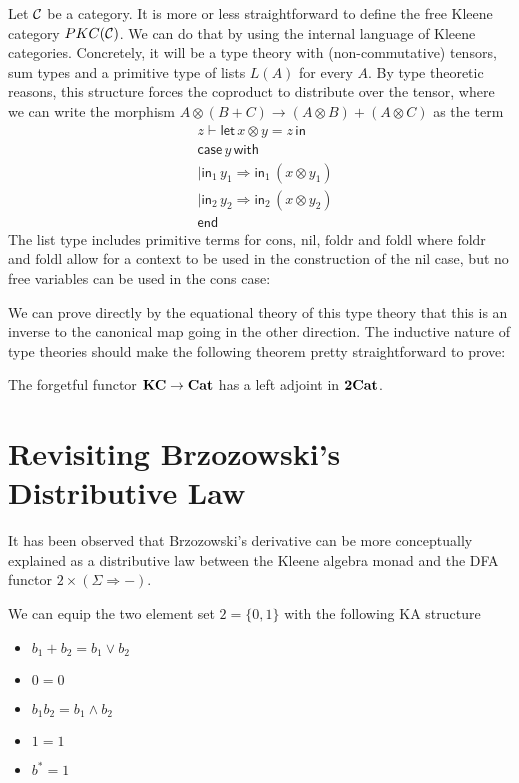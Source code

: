 \documentclass[acmsmall,anonymous,review,screen]{acmart}
\newcommand{\cat}[1]{
  \relax
  \StrLen{#1}[\arglength]
  \ifnum\arglength=1
  \mathcal{#1}
  \else
  \mathbf{#1}
  \fi
}
\begin{document}
Let $\cat{C}$ be a category. It is more or less straightforward to
define the free Kleene category $PKC(\cat{C})$. We can do that by
using the internal language of Kleene categories. Concretely, it
will be a type theory with (non-commutative) tensors, sum types and
a primitive type of lists $L(A)$ for every $A$. By type theoretic reasons, this
structure forces the coproduct to distribute over the tensor, where we
can write the morphism $A \otimes (B + C) \to (A \otimes B) + (A
\otimes C) $ as the term
\begin{align*}
  &z \vdash \mathsf{let}\, x \otimes y = z\, \mathsf{in}\\
  &\mathsf{case}\, y \, \mathsf{with}\\
  &| \mathsf{in}_1\, y_1 \Rightarrow \mathsf{in}_1\, (x \otimes y_1)\\
  &| \mathsf{in}_2\,y_2\Rightarrow \mathsf{in}_2 \,(x \otimes y_2)\\
  &\mathsf{end}
\end{align*}
%
The list type includes primitive terms for $\textrm{cons}$,
$\textrm{nil}$, $\textrm{foldr}$ and $\textrm{foldl}$ where
$\textrm{foldr}$ and $\textrm{foldl}$ allow for a context to be used
in the construction of the nil case, but no free variables can be used
in the cons case:

We can prove directly by the equational theory of this type theory
that this is an inverse to the canonical map going in the other
direction. The inductive nature of type theories should make the
following theorem pretty straightforward to prove:
%
\begin{theorem}
  The forgetful functor $\cat{KC} \to \cat{Cat}$ has a left adjoint
  in $\cat{2Cat}$.
\end{theorem}

\section{Revisiting Brzozowski's Distributive Law}

It has been observed that Brzozowski's derivative can be more conceptually
explained as a distributive law between the Kleene algebra monad and the
DFA functor $2 \times (\Sigma \Rightarrow -)$.

\begin{definition}
  We can equip the two element set $2 = \{0, 1 \}$ with the following KA structure
  \begin{itemize}
    \item $b_1 + b_2 = b_1 \lor b_2$
    \item $0 = 0$
    \item $b_1 b_2 = b_1 \land b_2$
    \item $1 = 1$
    \item $b^* = 1$
  \end{itemize}
\end{definition}
\end{document}
